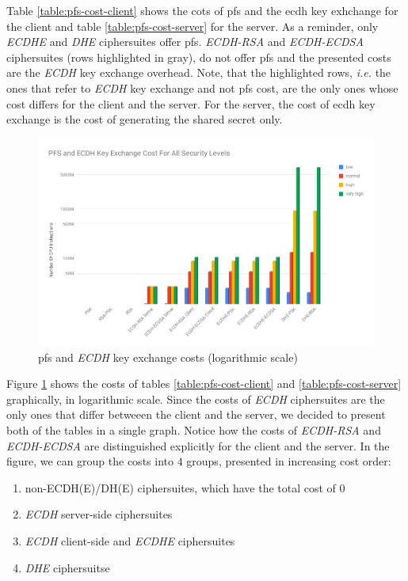 \documentclass{llncs}
\begin{document}
Table \ref{table:pfs-cost-client} shows the cots of \gls{pfs} and the \gls{ecdh} key exhchange for the client and table \ref{table:pfs-cost-server}
for the server. As a reminder, only \textit{ECDHE} and \textit{DHE} ciphersuites offer \gls{pfs}. \textit{ECDH-RSA} and \textit{ECDH-ECDSA}
ciphersuites (rows highlighted in gray), do not offer \gls{pfs} and the presented costs are the \textit{ECDH} key exchange overhead. Note, that the
highlighted rows, \textit{i.e.} the ones that refer to \textit{ECDH} key exchange and not \gls{pfs} cost, are the only ones whose cost differs for
the client and the server. For the server, the cost of \gls{ecdh} key exchange is the cost of generating the shared secret only.

\begin{figure}
  \centering
  \includegraphics[width=1.0\textwidth]{img/pfs_cost_all_sls.png}
  \caption{\label{fig:pfs-cost-all-sls} \gls{pfs} and \textit{ECDH} key exchange costs (logarithmic scale)}
\end{figure}

Figure \ref{fig:pfs-cost-all-sls} shows the costs of tables \ref{table:pfs-cost-client} and \ref{table:pfs-cost-server} graphically, in logarithmic scale.
 Since the costs 
of \textit{ECDH} ciphersuites are the only ones that differ betweeen the client and the server, we decided to present both of the tables in a
single graph. Notice how the costs of \textit{ECDH-RSA} and \textit{ECDH-ECDSA} are distinguished explicitly for the client and the server.
In the figure, we can group the costs into $4$ groups, presented in increasing cost order:

\begin{enumerate}
  \item non-ECDH(E)/DH(E) ciphersuites, which have the total cost of $0$
  \item \textit{ECDH} server-side ciphersuites
  \item \textit{ECDH} client-side and \textit{ECDHE} ciphersuites
  \item \textit{DHE} ciphersuitse
\end{enumerate}
\end{document}
